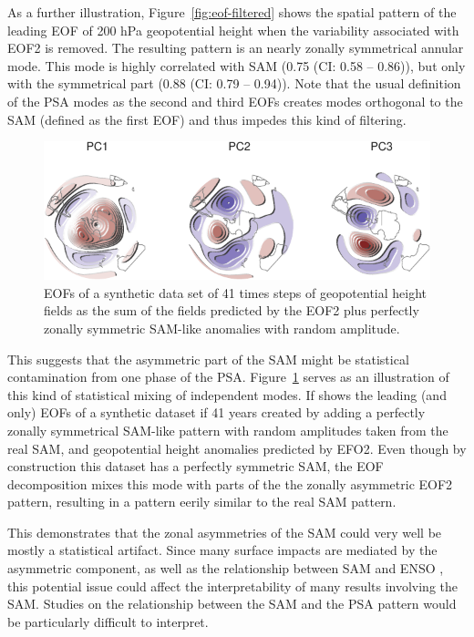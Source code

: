 \documentclass[smallextended]{svjour3}       %
\begin{document}
As a further illustration, Figure~\ref{fig:eof-filtered} shows the spatial pattern of the leading EOF of 200 hPa geopotential height when the variability associated with EOF2 is removed. The resulting pattern is an nearly zonally symmetrical annular mode. This mode is highly correlated with SAM (0.75 (CI: 0.58 -- 0.86)), but only with the symmetrical part (0.88 (CI: 0.79 -- 0.94)). Note that the usual definition of the PSA modes as the second and third EOFs creates modes orthogonal to the SAM (defined as the first EOF) and thus impedes this kind of filtering.



\begin{figure}
\centering
\includegraphics{../figures/fake-eof-1.pdf}
\caption{\label{fig:fake-eof}EOFs of a synthetic data set of 41 times steps of geopotential height fields as the sum of the fields predicted by the EOF2 plus perfectly zonally symmetric SAM-like anomalies with random amplitude.}
\end{figure}

This suggests that the asymmetric part of the SAM might be statistical contamination from one phase of the PSA. Figure~\ref{fig:fake-eof} serves as an illustration of this kind of statistical mixing of independent modes. If shows the leading (and only) EOFs of a synthetic dataset if 41 years created by adding a perfectly zonally symmetrical SAM-like pattern with random amplitudes taken from the real SAM, and geopotential height anomalies predicted by EFO2. Even though by construction this dataset has a perfectly symmetric SAM, the EOF decomposition mixes this mode with parts of the the zonally asymmetric EOF2 pattern, resulting in a pattern eerily similar to the real SAM pattern.

This demonstrates that the zonal asymmetries of the SAM could very well be mostly a statistical artifact. Since many surface impacts are mediated by the asymmetric component, as well as the relationship between SAM and ENSO \citep{campitelli2021}, this potential issue could affect the interpretability of many results involving the SAM. Studies on the relationship between the SAM and the PSA pattern would be particularly difficult to interpret.
\end{document}
